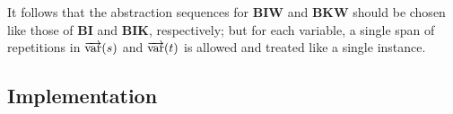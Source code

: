 It follows that the abstraction sequences for $\mathbf{BIW}$ and $\mathbf{BKW}$
should be chosen like those of $\mathbf{BI}$ and $\mathbf{BIK}$, respectively;
but for each variable, a single span of repetitions in $\overrightarrow{\operatorname{var}}(s)$ and
$\overrightarrow{\operatorname{var}}(t)$ is allowed and treated like a single instance.

\subsection{Implementation}\label{subsec:combinator-implementation}

\todo
